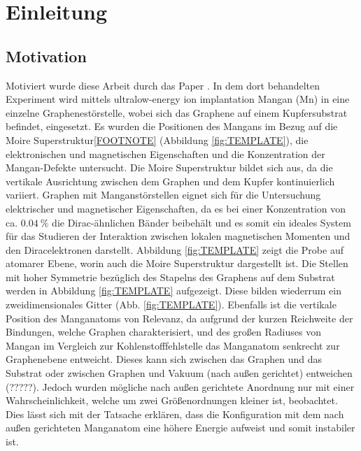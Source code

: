 \chapter{Einleitung}
\section{Motivation}
Motiviert wurde diese Arbeit durch das Paper \cite{TEMPLATE}.
In dem dort behandelten Experiment wird mittels ultralow-energy ion implantation Mangan (Mn) in eine einzelne Graphenestörstelle, wobei sich das Graphene auf einem Kupfersubstrat befindet, eingesetzt.
Es wurden die Positionen des Mangans im Bezug auf die Moire Superstruktur\ref{FOOTNOTE} (Abbildung \ref{fig:TEMPLATE}), die elektronischen und magnetischen Eigenschaften und die Konzentration der Mangan-Defekte
untersucht.
Die Moire Superstruktur bildet sich aus, da die vertikale Ausrichtung zwischen dem Graphen und dem Kupfer kontinuierlich variiert.
Graphen mit Manganstörstellen eignet sich für die Untersuchung elektrischer und magnetischer Eigenschaften, da es bei einer Konzentration von ca. $\qty{0.04}{\percent}$ 
die Dirac-ähnlichen Bänder beibehält und es somit ein ideales System für das Studieren der Interaktion
zwischen lokalen magnetischen Momenten und den Diracelektronen darstellt.
Abbildung \ref{fig:TEMPLATE} zeigt die Probe auf atomarer Ebene, worin auch die Moire Superstruktur dargestellt ist.
Die Stellen mit hoher Symmetrie bezüglich des Stapelns des Graphens auf dem Substrat werden in 
Abbildung \ref{fig:TEMPLATE} aufgezeigt.
Diese bilden wiederrum ein zweidimensionales Gitter (Abb. \ref{fig:TEMPLATE}).
Ebenfalls ist die vertikale Position des Manganatoms von Relevanz, da aufgrund der kurzen Reichweite der Bindungen,
welche Graphen charakterisiert, und des großen Radiuses von Mangan im Vergleich zur Kohlenstofffehlstelle das Manganatom senkrecht zur Graphenebene
entweicht.
Dieses kann sich zwischen das Graphen und das Substrat oder zwischen Graphen und Vakuum (nach außen gerichtet) entweichen (?????). 
Jedoch wurden mögliche nach außen gerichtete Anordnung nur mit einer Wahrscheinlichkeit, 
welche um zwei Größenordnungen kleiner ist, beobachtet.
Dies lässt sich mit der Tatsache erklären, dass die Konfiguration mit dem nach außen gerichteten Manganatom
eine höhere Energie aufweist und somit instabiler ist.
